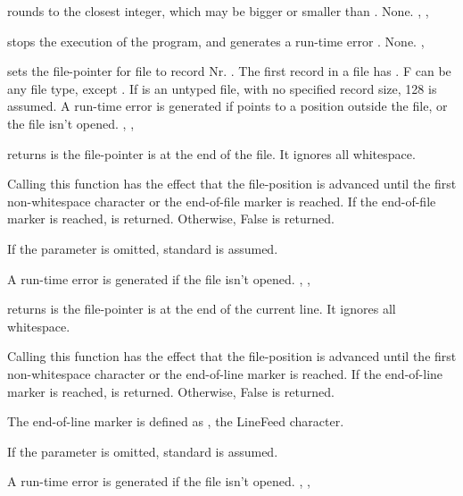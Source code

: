\documentclass{report}
\begin{document}


{ rounds  to the closest integer, which may be bigger or
smaller than .}
{None.}
{, , }



{ stops the execution of the program, and generates a
run-time error .}
{None.}
{, }



{ sets the file-pointer for file  to record Nr. .
The first record in a file has . F can be any file type, except
. If  is an untyped file, with no specified record size, 128
is assumed.}
{A run-time error is generated if  points to a position outside
the file, or the file isn't opened.}
{, , }



{ returns  is the file-pointer is at the end of the
file. It ignores all whitespace.

Calling this function has the effect that the file-position is advanced
until the first non-whitespace character or the end-of-file marker is
reached.
If the end-of-file marker is reached,  is returned. Otherwise,
False is returned.

If the parameter  is omitted, standard  is assumed.
}
{A run-time error is generated if the file  isn't opened.}
{, , }



{ returns  is the file-pointer is at the end of the
current line. It ignores all whitespace.

Calling this function has the effect that the file-position is advanced
until the first non-whitespace character or the end-of-line marker is
reached.
If the end-of-line marker is reached,  is returned. Otherwise,
False is returned.

The end-of-line marker is defined as , the LineFeed character.

If the parameter  is omitted, standard  is assumed.}
{A run-time error is generated if the file  isn't opened.}
{, , }
\end{document}
